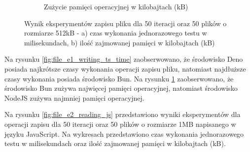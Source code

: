 \begin{figure}[H]
\begin{subfigure}[b]{0.44\textwidth}
    \caption{Zużycie pamięci operacyjnej w kilobajtach (kB)}
    \label{fig:file_e1_writing_ts_memory}
  \end{subfigure}
  \hfill
  \caption{Wynik eksperymentów zapisu pliku dla 50 iteracji oraz 50 plików o rozmiarze 512kB - a) czas wykonania jednorazowego testu w milisekundach, b) ilość zajmowanej pamięci w kilobajtach (kB)}
  \label{fig:file_e1_writing_ts}
\end{figure}

Na rysunku \ref{fig:file_e1_writing_ts_time} zaobserwowano, że środowisko Deno posiada najkrótsze czasy wykonania operacji zapisu pliku, natomiast najdłuższe czasy wykonania posiada środowisko Bun. Na rysunku \ref{fig:file_e1_writing_ts_memory} zaobserwowano, że środowisko Bun zużywa najwięcej pamięci operacyjnej, natomiast środowisko NodeJS zużywa najmniej pamięci operacyjnej.

Na rysunku \ref{fig:file_e2_reading_js} przedstawiono wyniki eksperymentów dla operacji zapisu dla 50 iteracji oraz 50 plików o rozmiarze 1MB napisanego w języku JavaScript. Na wykresach przedstawiono czas wykonania jednorazowego testu w milisekundach oraz ilość zajmowanej pamięci w kilobajtach (kB).

